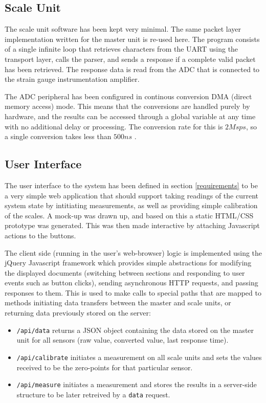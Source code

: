 \subsection{Scale Unit}
The scale unit software has been kept very minimal. The same packet layer implementation written for the master unit is re-used here. The program consists of a single infinite loop that retrieves characters from the UART using the transport layer, calls the parser, and sends a response if a complete valid packet has been retrieved. The response data is read from the ADC that is connected to the strain gauge instrumentation amplifier.

The ADC peripheral has been configured in continous conversion DMA (direct memory access) mode. This means that the conversions are handled purely by hardware, and the results can be accessed through a global variable at any time with no additional delay or processing. The conversion rate for this is $2\unit{Msps}$, so a single conversion takes less than $500\unit{ns}$ \cite[page 125]{stm32f4-trm}.


\subsection{User Interface}
The user interface to the system has been defined in section \ref{requirements} to be a very simple web application that should support taking readings of the current system state by intitiating measurements, as well as providing simple calibration of the scales. A mock-up was drawn up, and based on this a static HTML/CSS prototype was generated. This was then made interactive by attaching Javascript actions to the buttons.

The client side (running in the user's web-browser) logic is implemented using the jQuery Javascript framework \cite{jquery} which provides simple abstractions for modifying the displayed documents (switching between sections and responding to user events such as button clicks), sending asynchronous HTTP requests, and passing responses to them. This is used to make calls to special paths that are mapped to methods initiating data transfers between the master and scale units, or returning data previously stored on the server:

\begin{itemize}
	\item \texttt{/api/data} returns a JSON \cite{json-spec} object containing the data stored on the master unit for all sensors (raw value, converted value, last response time).
	\item \texttt{/api/calibrate} initiates a measurement on all scale units and sets the values received to be the zero-points for that particular sensor.
	\item \texttt{/api/measure} initiates a measurement and stores the results in a server-side structure to be later retreived by a \texttt{data} request.
\end{itemize}

